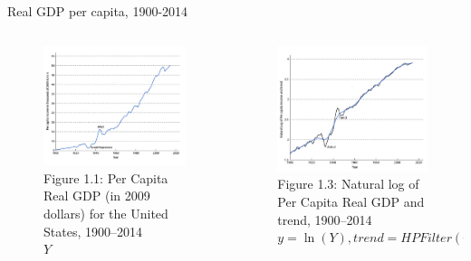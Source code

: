 \documentclass[11pt,aspectratio=43]{beamer}
\theoremstyle{definition}
\begin{document}
\begin{frame}{Real GDP per capita, 1900-2014}
\label{slide:Real_GDP_per_capita__1900_2020}
    \begin{columns}
        \begin{column}{0.5\textwidth}
            \begin{figure}
                \caption{Figure 1.1: Per Capita Real GDP (in 2009 dollars) for the United States, 1900–2014 \\ \alert{$Y$}}
                \includegraphics[width=\textwidth]{./figures/Figure1_1.jpg}
            \end{figure}
        \end{column}
        \begin{column}{0.5\textwidth}
            \begin{figure}
                \caption{Figure 1.3: Natural log of Per Capita Real GDP and trend, 1900–2014 \\ \alert{$y = \ln(Y), trend = HPFilter(y)$}}
                \includegraphics[width=\textwidth]{./figures/Figure1_3.jpg}

\end{figure}
\end{column}
\end{columns}
\end{frame}
\end{document}
